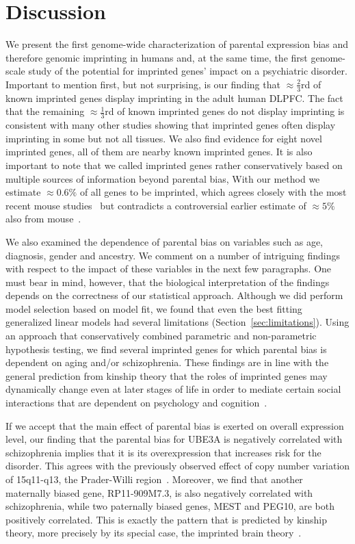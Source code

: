 \documentclass[letterpaper]{article}
\begin{document}
\section{Discussion}

We present the first genome-wide characterization of parental expression bias
and therefore genomic imprinting in humans and, at the same time, the first
genome-scale study of the potential for imprinted genes' impact on a
psychiatric disorder.  Important to mention first, but not surprising, is our
finding that \(\approx \frac{2}{3}\)rd of known imprinted genes display
imprinting in the adult human DLPFC. The fact that the remaining \(\approx
\frac{1}{3}\)rd of known imprinted genes do not display imprinting is
consistent with many other studies showing that imprinted genes often display
imprinting in some but not all tissues. We also find evidence for eight novel
imprinted genes, all of them are nearby known imprinted genes. It is also
important to note that we called imprinted genes rather conservatively based
on multiple sources of information beyond parental bias, With our method we
estimate \(\approx 0.6\%\) of all genes to be imprinted, which agrees closely
with the most recent mouse studies~\cite{DeVeale2012,Perez2015} but
contradicts a controversial earlier estimate of \(\approx 5\%\) also from
mouse~\cite{Gregg2010a}.

We also examined the dependence of parental bias on variables such as age,
diagnosis, gender and ancestry. We comment on a number of intriguing findings
with respect to the impact of these variables in the next few paragraphs.  One
must bear in mind, however, that the biological interpretation of the findings
depends on the correctness of our statistical approach.  Although we did
perform model selection based on model fit, we found that even the best
fitting generalized linear models had several limitations
(Section~\ref{sec:limitations}).  Using an approach that conservatively
combined parametric and non-parametric hypothesis testing, we find several
imprinted genes for which parental bias is dependent on aging and/or
schizophrenia. These findings are in line with the general prediction from
kinship theory that the roles of imprinted genes may dynamically change even
at later stages of life in order to mediate certain social interactions that
are dependent on psychology and cognition~\cite{Ubeda2012,Wilkins2003}.

If we accept that the main effect of parental bias is exerted on overall expression
level, our finding that the parental bias for UBE3A is negatively correlated
with schizophrenia implies that it is its overexpression that increases risk
for the disorder.  This agrees with the previously observed effect of copy
number variation of 15q11-q13, the Prader-Willi region~\cite{McNamara2013}.
Moreover, we find that another maternally biased gene, RP11-909M7.3, is also
negatively correlated with schizophrenia, while two paternally biased genes,
MEST and PEG10, are both positively correlated.  This is exactly the pattern
that is predicted by kinship theory, more precisely by its special case, the
imprinted brain theory~\cite{Crespi2008a}.
\end{document}
